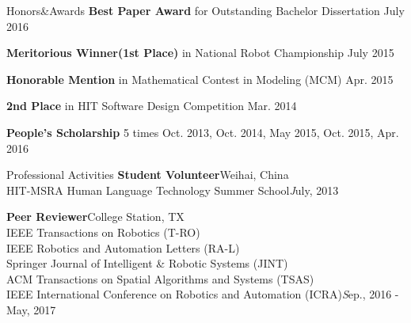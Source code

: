 \documentclass{resume} %
\begin{document}
\begin{rSection}{Honors\&Awards}
{\bf Best Paper Award}{ for Outstanding Bachelor Dissertation} \hfill {July 2016}
\vspace*{-0.4em}

{\bf Meritorious Winner(1st Place)}{ in National Robot Championship} \hfill {July 2015}
\vspace*{-0.4em}

{\bf Honorable Mention}{ in Mathematical Contest in Modeling (MCM)} \hfill {Apr. 2015}
\vspace*{-0.4em}

{\bf 2nd Place}{ in HIT Software Design Competition} \hfill {Mar. 2014} 
\vspace*{-0.4em}

{\bf People's Scholarship} 5 times \hfill {Oct. 2013, Oct. 2014, May 2015, Oct. 2015, Apr. 2016}
\vspace*{-0.4em}

\end{rSection}

\begin{rSection}{Professional Activities}
{\bf Student Volunteer}\hfill Weihai, China\\
HIT-MSRA Human Language Technology Summer School\hfill {\emph July, 2013}
\vspace*{-0.2em}

{\bf Peer Reviewer}\hfill College Station, TX\\
IEEE Transactions on Robotics (T-RO)\\
IEEE Robotics and Automation Letters (RA-L)\\
Springer Journal of Intelligent \& Robotic Systems (JINT)\\
ACM Transactions on Spatial Algorithms and Systems (TSAS)\\
IEEE International Conference on Robotics and Automation (ICRA)\hfill {\emph Sep., 2016 - May, 2017}
\end{rSection}
\end{document}
